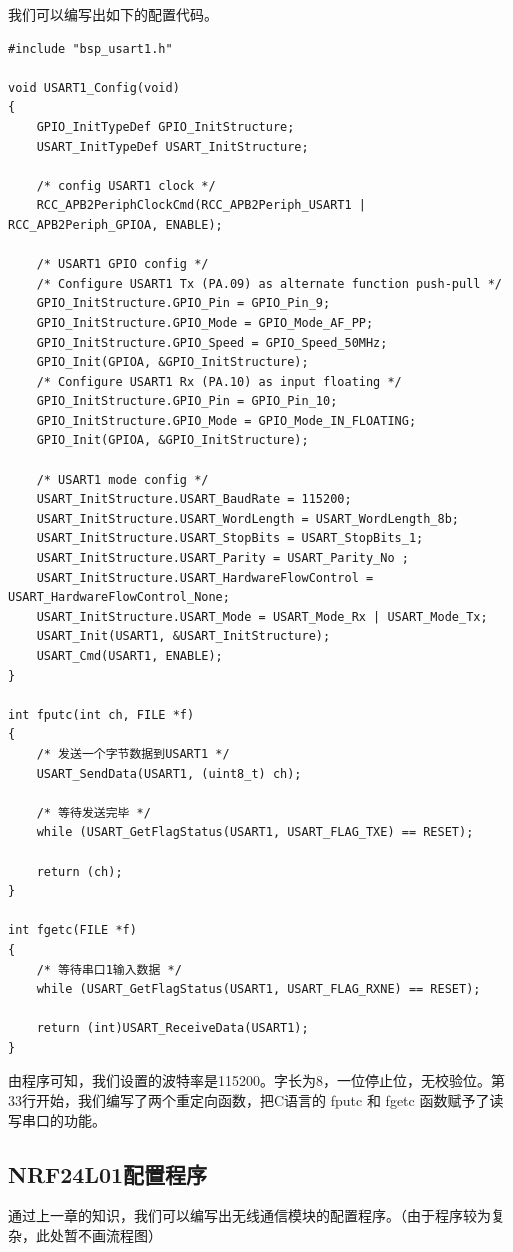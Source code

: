 \documentclass[UTF8,a4paper,11pt]{article}
\begin{document}
我们可以编写出如下的配置代码。

\begin{lstlisting}[caption={}]
#include "bsp_usart1.h"

void USART1_Config(void)
{
	GPIO_InitTypeDef GPIO_InitStructure;
	USART_InitTypeDef USART_InitStructure;
		
	/* config USART1 clock */
	RCC_APB2PeriphClockCmd(RCC_APB2Periph_USART1 | RCC_APB2Periph_GPIOA, ENABLE);
		
	/* USART1 GPIO config */
	/* Configure USART1 Tx (PA.09) as alternate function push-pull */
	GPIO_InitStructure.GPIO_Pin = GPIO_Pin_9;
	GPIO_InitStructure.GPIO_Mode = GPIO_Mode_AF_PP;
	GPIO_InitStructure.GPIO_Speed = GPIO_Speed_50MHz;
	GPIO_Init(GPIOA, &GPIO_InitStructure);    
	/* Configure USART1 Rx (PA.10) as input floating */
	GPIO_InitStructure.GPIO_Pin = GPIO_Pin_10;
	GPIO_InitStructure.GPIO_Mode = GPIO_Mode_IN_FLOATING;
	GPIO_Init(GPIOA, &GPIO_InitStructure);
			
	/* USART1 mode config */
	USART_InitStructure.USART_BaudRate = 115200;
	USART_InitStructure.USART_WordLength = USART_WordLength_8b;
	USART_InitStructure.USART_StopBits = USART_StopBits_1;
	USART_InitStructure.USART_Parity = USART_Parity_No ;
	USART_InitStructure.USART_HardwareFlowControl = USART_HardwareFlowControl_None;
	USART_InitStructure.USART_Mode = USART_Mode_Rx | USART_Mode_Tx;
	USART_Init(USART1, &USART_InitStructure); 
	USART_Cmd(USART1, ENABLE);
}

int fputc(int ch, FILE *f)
{
	/* 发送一个字节数据到USART1 */
	USART_SendData(USART1, (uint8_t) ch);
		
	/* 等待发送完毕 */
	while (USART_GetFlagStatus(USART1, USART_FLAG_TXE) == RESET);		
	
	return (ch);
}

int fgetc(FILE *f)
{
	/* 等待串口1输入数据 */
	while (USART_GetFlagStatus(USART1, USART_FLAG_RXNE) == RESET);

	return (int)USART_ReceiveData(USART1);
}
\end{lstlisting}

由程序可知，我们设置的波特率是115200。字长为8，一位停止位，无校验位。第33行开始，我们编写了两个重定向函数，把C语言的 fputc 和 fgetc 函数赋予了读写串口的功能。

\subsection{NRF24L01配置程序}
通过上一章的知识，我们可以编写出无线通信模块的配置程序。（由于程序较为复杂，此处暂不画流程图）
\end{document}
